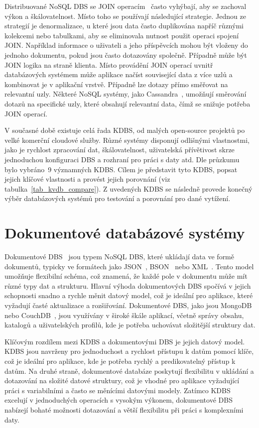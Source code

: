 \documentclass[czech,master,dept460,male,csharp,cpdeclaration]{diploma}
\begin{document}
	Distribuované NoSQL DBS se JOIN operacím~\cite{join} často vyhýbají, aby se zachoval výkon a škálovatelnost. Místo toho se používají následující strategie. Jednou ze strategií je denormalizace, u které jsou data často duplikována napříč různými kolekcemi nebo tabulkami, aby se eliminovala nutnost použit operaci spojení JOIN. Například informace o uživateli a jeho příspěvcích mohou být vloženy do jednoho dokumentu, pokud jsou často dotazovány společně. Případně může být JOIN logika na straně klienta. Místo provádění JOIN operací uvnitř databázových systémem může aplikace načíst související data z více uzlů a kombinovat je v aplikační vrstvě. Případně lze dotazy přímo směřovat na relevantní uzly. Některé NoSQL systémy, jako Cassandra~\cite{cassandra}, umožňují směrování dotazů na specifické uzly, které obsahují relevantní data, čímž se snižuje potřeba JOIN operací.
	
	V současné době existuje celá řada KDBS, od malých open-source projektů po velké komerční cloudové služby. Různé systémy disponují odlišnými vlastnostmi, jako je rychlost zpracování dat, škálovatelnost, uživatelská přívětivost skrze jednoduchou konfiguraci DBS a rozhraní pro práci s daty atd. Dle průzkumu~\cite{predictiveanalyticstoday,g2,db-engineers-ranking} bylo vybráno~9 významných KDBS. Cílem je představit tyto KDBS, popsat jejich klíčové vlastnosti a provést jejich porovnání (viz tabulka~\ref{tab_kvdb_compare}). Z uvedených KDBS se následně provede konečný výběr databázových systémů pro testování a porovnání pro dané vytížení.
	
	\section{Dokumentové databázové systémy}
	
	Dokumentové DBS~\cite{nosql, dokument-dbs} jsou typem NoSQL DBS, které ukládají data ve formě dokumentů, typicky ve formátech jako JSON~\cite{json}, BSON~\cite{bson} nebo XML~\cite{xml}. Tento model umožňuje flexibilní schéma, což znamená, že každé pole v dokumentu může mít různé typy dat a strukturu. Hlavní výhoda dokumentových DBS spočívá v jejich schopnosti snadno a rychle měnit datový model, což je ideální pro aplikace, které vyžadují časté aktualizace a rozšiřování. Dokumentové DBS, jako jsou MongoDB~\cite{mongodb} nebo CouchDB~\cite{couchdb}, jsou využívány v široké škále aplikací, včetně správy obsahu, katalogů a uživatelských profilů, kde je potřeba uchovávat složitější struktury dat.
	
	Klíčovým rozdílem mezi KDBS a dokumentovými DBS je jejich datový model. KDBS jsou navrženy pro jednoduchost a rychlost přístupu k datům pomocí klíče, což je ideální pro aplikace, kde je potřeba rychlý a predikovatelný přístup k datům. Na druhé straně, dokumentové databáze poskytují flexibilitu v ukládání a dotazování na složité datové struktury, což je vhodné pro aplikace vyžadující práci s variabilními a často se měnícími datovými modely. Zatímco KDBS excelují v jednoduchých operacích s vysokým výkonem, dokumentové DBS nabízejí bohaté možnosti dotazování a větší flexibilitu při práci s komplexními daty.
	
\end{document}
